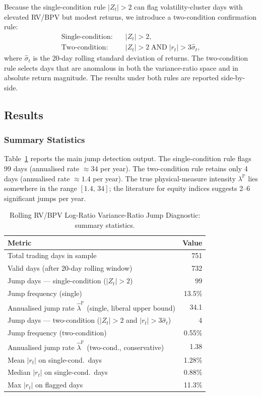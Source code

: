 \documentclass[12pt]{article}
\begin{document}
Because the single-condition rule $|Z_t|>2$ can flag volatility-cluster days with elevated RV/BPV but modest returns, we introduce a two-condition confirmation rule:
\begin{align}
\text{Single-condition:} &\quad |Z_t|>2, \label{eq:single} \\
\text{Two-condition:} &\quad |Z_t|>2 \;\text{AND}\; |r_t|>3\hat{\sigma}_t, \label{eq:two}
\end{align}
where $\hat{\sigma}_t$ is the 20-day rolling standard deviation of returns. The two-condition rule selects days that are anomalous in both the variance-ratio space and in absolute return magnitude. The results under both rules are reported side-by-side.

\subsection*{Results}

\subsubsection*{Summary Statistics}

Table~\ref{tab:jump-summary} reports the main jump detection output. The single-condition rule flags 99 days (annualised rate $\approx 34$ per year). The two-condition rule retains only 4 days (annualised rate $\approx 1.4$ per year). The true physical-measure intensity $\lambda^{\mathbb{P}}$ lies somewhere in the range $[1.4,\,34]$; the literature for equity indices suggests 2--6 significant jumps per year.

\begin{table}[H]
\centering
\caption{Rolling RV/BPV Log-Ratio Variance-Ratio Jump Diagnostic: summary statistics.}
\label{tab:jump-summary}
\begin{tabular}{lr}
\toprule
Metric & Value \\
\midrule
Total trading days in sample & 751 \\
Valid days (after 20-day rolling window) & 732 \\
Jump days --- single-condition ($|Z_t|>2$) & 99 \\
Jump frequency (single) & 13.5\% \\
Annualised jump rate $\hat{\lambda}^{\mathbb{P}}$ (single, liberal upper bound) & 34.1 \\
Jump days --- two-condition ($|Z_t|>2$ and $|r_t|>3\hat{\sigma}_t$) & 4 \\
Jump frequency (two-condition) & 0.55\% \\
Annualised jump rate $\hat{\lambda}^{\mathbb{P}}$ (two-cond., conservative) & 1.38 \\
Mean $|r_t|$ on single-cond.\ days & 1.28\% \\
Median $|r_t|$ on single-cond.\ days & 0.88\% \\
Max $|r_t|$ on flagged days & 11.3\% \\
\bottomrule
\end{tabular}
\end{table}
\end{document}
